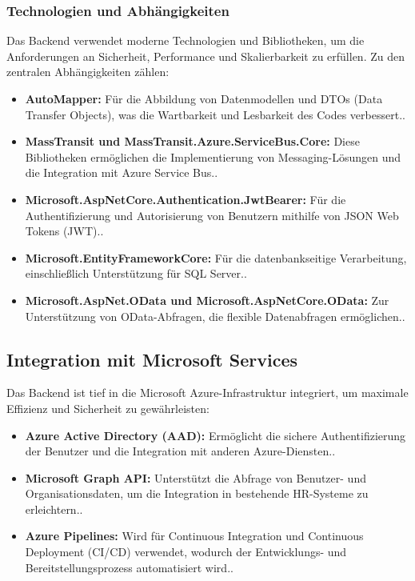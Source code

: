\subsubsection*{Technologien und Abhängigkeiten}
Das Backend verwendet moderne Technologien und Bibliotheken, um die Anforderungen an Sicherheit, Performance und Skalierbarkeit zu erfüllen. Zu den zentralen Abhängigkeiten zählen:
\begin{itemize}
    \item \textbf{AutoMapper:} Für die Abbildung von Datenmodellen und DTOs (Data Transfer Objects), was die Wartbarkeit und Lesbarkeit des Codes verbessert.\cite{automapperDocs2024}.
    \item \textbf{MassTransit und MassTransit.Azure.ServiceBus.Core:} Diese Bibliotheken ermöglichen die Implementierung von Messaging-Lösungen und die Integration mit Azure Service Bus.\cite{masstransit2021}.
    \item \textbf{Microsoft.AspNetCore.Authentication.JwtBearer:} Für die Authentifizierung und Autorisierung von Benutzern mithilfe von JSON Web Tokens (JWT).\cite{jwtAuthDocs2024}.
    \item \textbf{Microsoft.EntityFrameworkCore:} Für die datenbankseitige Verarbeitung, einschließlich Unterstützung für SQL Server.\cite{efCoreDocs2024}.
    \item \textbf{Microsoft.AspNet.OData und Microsoft.AspNetCore.OData:} Zur Unterstützung von OData-Abfragen, die flexible Datenabfragen ermöglichen.\cite{odata2022}.
\end{itemize}

\subsection{Integration mit Microsoft Services}

Das Backend ist tief in die Microsoft Azure-Infrastruktur integriert, um maximale Effizienz und Sicherheit zu gewährleisten:
\begin{itemize}
    \item \textbf{Azure Active Directory (AAD):} Ermöglicht die sichere Authentifizierung der Benutzer und die Integration mit anderen Azure-Diensten.\cite{azureAD2021}.
    \item \textbf{Microsoft Graph API:} Unterstützt die Abfrage von Benutzer- und Organisationsdaten, um die Integration in bestehende HR-Systeme zu erleichtern.\cite{microsoftGraph2020}.
    \item \textbf{Azure Pipelines:} Wird für Continuous Integration und Continuous Deployment (CI/CD) verwendet, wodurch der Entwicklungs- und Bereitstellungsprozess automatisiert wird.\cite{azurePipelines2021}.
\end{itemize}

